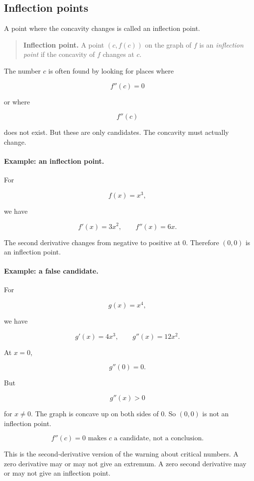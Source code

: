 \subsection{Inflection points}
\label{subsec:inflection-points}

A point where the concavity changes is called an inflection point.

\begin{quote}
\textbf{Inflection point.}
A point \((c,f(c))\) on the graph of \(f\) is an \emph{inflection point} if the concavity
of \(f\) changes at \(c\).
\end{quote}

The number \(c\) is often found by looking for places where

\[
f''(c)=0
\]

or where

\[
f''(c)
\]

does not exist.  But these are only candidates.  The concavity must actually change.

\paragraph{Example: an inflection point.}
For

\[
f(x)=x^3,
\]

we have

\[
f'(x)=3x^2,
\qquad
f''(x)=6x.
\]

The second derivative changes from negative to positive at \(0\).  Therefore
\((0,0)\) is an inflection point.

\paragraph{Example: a false candidate.}
For

\[
g(x)=x^4,
\]

we have

\[
g'(x)=4x^3,
\qquad
g''(x)=12x^2.
\]

At \(x=0\),

\[
g''(0)=0.
\]

But

\[
g''(x)>0
\]

for \(x\neq0\).  The graph is concave up on both sides of \(0\).  So \((0,0)\) is
not an inflection point.

\[
\boxed{
f''(c)=0 \text{ makes } c \text{ a candidate, not a conclusion.}
}
\]

This is the second-derivative version of the warning about critical numbers.  A
zero derivative may or may not give an extremum.  A zero second derivative may or
may not give an inflection point.

